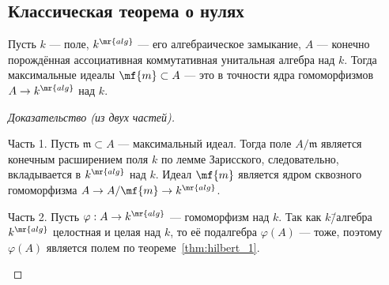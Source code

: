 \documentclass[
	extrafontsizes,
	11pt,
	hyphens,
]{memoir}
\begin{document}
\subsection{Классическая теорема о нулях}

%

\begin{theorem}
Пусть \(k\) --- поле, \(k^\mr{alg}\) --- его алгебраическое замыкание, \(A\) --- конечно порождённая ассоциативная коммутативная унитальная алгебра над \(k\).
Тогда максимальные идеалы \(\mf{m} \subset A\) --- это в точности ядра гомоморфизмов \(A \to k^\mr{alg}\) над \(k\).
\end{theorem}

\begin{proof}[Доказательство (из двух частей)]
~\begin{proofdescription}

\item[Часть 1.]
Пусть \(\mathfrak{m} \subset A\) --- максимальный идеал. Тогда поле \(A / \mathfrak{m}\) является конечным расширением поля \(k\) по лемме Зарисского, следовательно, вкладывается в \(k^\mr{alg}\) над \(k\). 
Идеал \(\mf{m}\) является ядром сквозного гомоморфизма \(A \to A / \mf{m} \to k^\mr{alg}\).

\item[Часть 2.]
Пусть \(\varphi: A \to k^\mr{alg}\) --- гомоморфизм над \(k\). Так как \(k\)\=/алгебра \(k^\mr{alg}\) целостная и целая над \(k\), то её подалгебра \(\varphi(A)\) --- тоже, поэтому \(\varphi(A)\) является полем по теореме~\ref{thm:hilbert_1}.
\qedhere

\end{proofdescription}
\end{proof}
\end{document}
